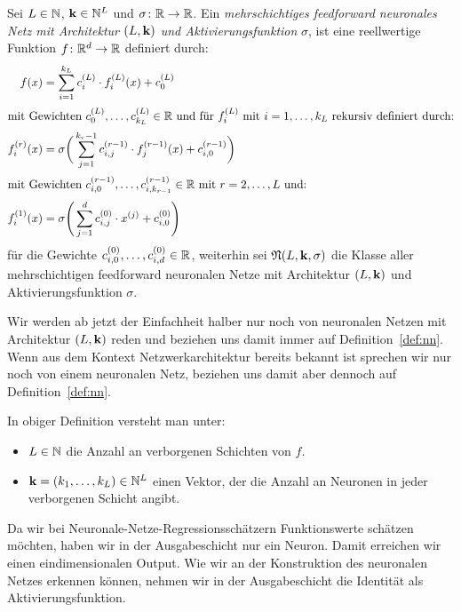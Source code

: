 \begin{defn}
\label{def:nn}
Sei $L \in \mathbb{N}$, $\mathbf{k} \in \mathbb{N}^L$ und $\sigma\colon \mathbb{R} \to \mathbb{R}$. Ein \emph{mehrschichtiges feedforward neuronales Netz mit Architektur $(L, \mathbf{k})$ und Aktivierungsfunktion} $\sigma$, ist eine reellwertige Funktion $f\colon \mathbb{R}^d \to \mathbb{R}$ definiert durch:
\begin{align}
\label{networkarch}
f(x) & = \sum_{i = 1}^{k_L} c_i^{(L)} \cdot f_i^{(L)}(x) + c_0^{(L)} \nonumber \\
\intertext{mit Gewichten $c_0^{(L)},\dots,c_{k_L}^{(L)} \in \mathbb{R}$ und für $f_i^{(L)}$ mit $i = 1,\dots,k_L$ rekursiv definiert durch:} 
f_i^{(r)}(x) & = \sigma \bigg(\sum_{j = 1}^{k_r - 1} c_{i,j}^{(r - 1)} \cdot f_j^{(r - 1)}(x) + c_{i,0}^{(r - 1)} \bigg)\\
\intertext{mit Gewichten $c_{i,0}^{(r - 1)},\dots,c_{i,k_{r - 1}}^{(r - 1)} \in \mathbb{R}$ mit $r = 2,\dots, L$ und:}
f_i^{(1)}(x) & = \sigma \Bigg(\sum_{j = 1}^{d} c_{i,j}^{(0)} \cdot x^{(j)} + c_{i,0}^{(0)} \Bigg) \nonumber
\end{align} 
für die Gewichte $c_{i,0}^{(0)},\dots,c_{i,d}^{(0)} \in \mathbb{R}$,
weiterhin sei $\mathfrak{N}(L, \mathbf{k}, \sigma)$ die Klasse aller mehrschichtigen feedforward neuronalen Netze mit Architektur $(L, \mathbf{k})$ und Aktivierungsfunktion $\sigma$.
\end{defn}
Wir werden ab jetzt der Einfachheit halber nur noch von neuronalen Netzen mit Architektur $(L,\mathbf{k})$ reden und beziehen uns damit immer auf Definition~\ref{def:nn}. Wenn aus dem Kontext Netzwerkarchitektur bereits bekannt ist sprechen wir nur noch von einem neuronalen Netz, beziehen uns damit aber dennoch auf Definition~\ref{def:nn}.
\begin{bemnumber}
In obiger Definition versteht man unter:
\begin{itemize}
\item $L \in \mathbb{N}$ die Anzahl an verborgenen Schichten von $f$.
\item $\mathbf{k} = (k_1,\dots,k_L) \in \mathbb{N}^L$ einen Vektor, der die Anzahl an Neuronen in jeder verborgenen Schicht angibt.
\end{itemize}
\end{bemnumber}
Da wir bei Neuronale-Netze-Regressionsschätzern Funktionswerte schätzen möchten, haben wir in der Ausgabeschicht nur ein Neuron. Damit erreichen wir einen eindimensionalen Output. Wie wir an der Konstruktion des neuronalen Netzes erkennen können, nehmen wir in der Ausgabeschicht die Identität als Aktivierungsfunktion.

